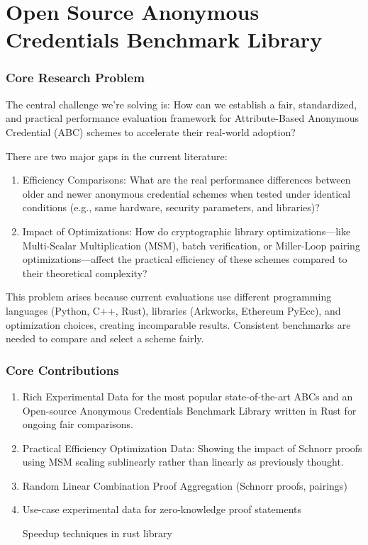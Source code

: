 \chapter{Open Source Anonymous Credentials Benchmark Library}



\subsection{Core Research Problem}
The central challenge we’re solving is: How can we establish a fair, standardized, and practical performance evaluation framework for Attribute-Based Anonymous Credential (ABC) schemes to accelerate their real-world adoption? 

There are two major gaps in the current literature:
\begin{enumerate}
    \item Efficiency Comparisons: What are the real performance differences between older and newer anonymous credential schemes when tested under identical conditions (e.g., same hardware, security parameters, and libraries)?

    \item Impact of Optimizations: How do cryptographic library optimizations—like Multi-Scalar Multiplication (MSM), batch verification, or Miller-Loop pairing optimizations—affect the practical efficiency of these schemes compared to their theoretical complexity?
    
\end{enumerate}
This problem arises because current evaluations use different programming languages (Python, C++, Rust), libraries (Arkworks, Ethereum PyEcc), and optimization choices, creating incomparable results. Consistent benchmarks are needed to compare and select a scheme fairly. 



\subsection{Core Contributions}

\begin{enumerate}
    \item Rich Experimental Data for the most popular state-of-the-art ABCs and an Open-source Anonymous Credentials Benchmark Library written in Rust for ongoing fair comparisons. 

    \item Practical Efficiency Optimization Data: Showing the impact of Schnorr proofs using MSM scaling sublinearly rather than linearly as previously thought. 

    \item Random Linear Combination Proof Aggregation (Schnorr proofs, pairings)

    \item Use-case experimental data for zero-knowledge proof statements

    Speedup techniques in rust library
    
\end{enumerate}


